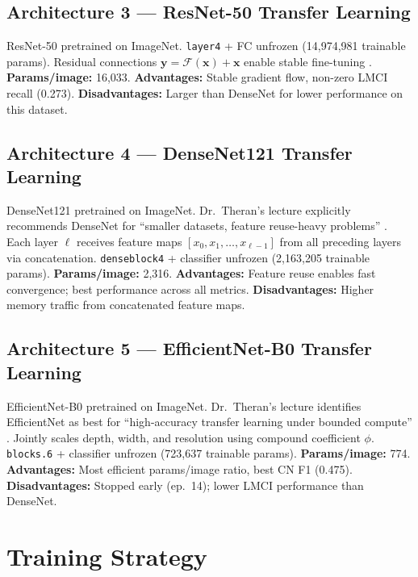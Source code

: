 \documentclass[12pt, a4paper]{article}
\begin{document}
\subsection{Architecture 3 --- ResNet-50 Transfer Learning}

ResNet-50 \cite{he2016} pretrained on ImageNet.
\texttt{layer4} + FC unfrozen (14,974,981 trainable
params). Residual connections $\mathbf{y} =
\mathcal{F}(\mathbf{x}) + \mathbf{x}$ enable stable
fine-tuning \cite{theran2026cnn}.
\textbf{Params/image:} 16,033.
\textbf{Advantages:} Stable gradient flow, non-zero
LMCI recall (0.273). \textbf{Disadvantages:} Larger
than DenseNet for lower performance on this dataset.

\subsection{Architecture 4 --- DenseNet121 Transfer Learning}

DenseNet121 \cite{huang2017} pretrained on ImageNet.
Dr.\ Theran's lecture explicitly recommends DenseNet for
``smaller datasets, feature reuse-heavy problems''
\cite{theran2026cnn}. Each layer $\ell$ receives feature
maps $[x_0, x_1, \ldots, x_{\ell-1}]$ from all preceding
layers via concatenation. \texttt{denseblock4} +
classifier unfrozen (2,163,205 trainable params).
\textbf{Params/image:} 2,316. \textbf{Advantages:}
Feature reuse enables fast convergence; best performance
across all metrics. \textbf{Disadvantages:} Higher
memory traffic from concatenated feature maps.

\subsection{Architecture 5 --- EfficientNet-B0 Transfer Learning}

EfficientNet-B0 \cite{tan2019} pretrained on ImageNet.
Dr.\ Theran's lecture identifies EfficientNet as best for
``high-accuracy transfer learning under bounded compute''
\cite{theran2026cnn}. Jointly scales depth, width, and
resolution using compound coefficient $\phi$.
\texttt{blocks.6} + classifier unfrozen (723,637
trainable params). \textbf{Params/image:} 774.
\textbf{Advantages:} Most efficient params/image ratio,
best CN F1 (0.475). \textbf{Disadvantages:} Stopped
early (ep.\ 14); lower LMCI performance than DenseNet.

\section{Training Strategy}
\label{sec:training}
\end{document}
